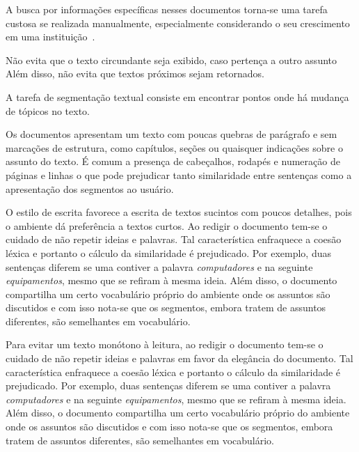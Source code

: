 
A busca por informações específicas nesses documentos torna-se uma tarefa custosa se realizada manualmente, especialmente considerando o seu crescimento em uma instituição~\cite{Lee2011, Masakazu2013, Miriam2013}.





Não evita que o texto circundante seja exibido, caso pertença a outro assunto
Além disso, não evita que textos próximos sejam retornados.

A tarefa de segmentação textual consiste em encontrar pontos onde há mudança de tópicos no texto.  %



 Os documentos apresentam um texto com poucas quebras de parágrafo e sem marcações de estrutura, como capítulos, seções ou quaisquer indicações sobre o assunto do texto. É comum a presença de cabeçalhos, rodapés e numeração de páginas e linhas o que pode prejudicar tanto similaridade entre sentenças como a apresentação dos segmentos ao usuário. %



O estilo de escrita favorece a escrita de textos sucintos com poucos detalhes, pois o ambiente dá preferência a textos curtos. Ao redigir o documento tem-se o cuidado de não repetir ideias e palavras. Tal característica enfraquece a coesão léxica e portanto o cálculo da similaridade é prejudicado. Por exemplo, duas sentenças diferem se uma contiver a palavra \textit{computadores} e na seguinte \textit{equipamentos}, mesmo que se refiram à mesma ideia. Além disso, o documento compartilha um certo vocabulário próprio do ambiente onde os assuntos são discutidos e com isso nota-se que os segmentos, embora tratem de assuntos diferentes, são semelhantes em vocabulário.


Para evitar um texto monótono à leitura, ao redigir o documento tem-se o cuidado de não repetir ideias e palavras em favor da elegância do documento. Tal característica enfraquece a coesão léxica e portanto o cálculo da similaridade é prejudicado. Por exemplo, duas sentenças diferem se uma contiver a palavra \textit{computadores} e na seguinte \textit{equipamentos}, mesmo que se refiram à mesma ideia. Além disso, o documento compartilha um certo vocabulário próprio do ambiente onde os assuntos são discutidos e com isso nota-se que os segmentos, embora tratem de assuntos diferentes, são semelhantes em vocabulário.


